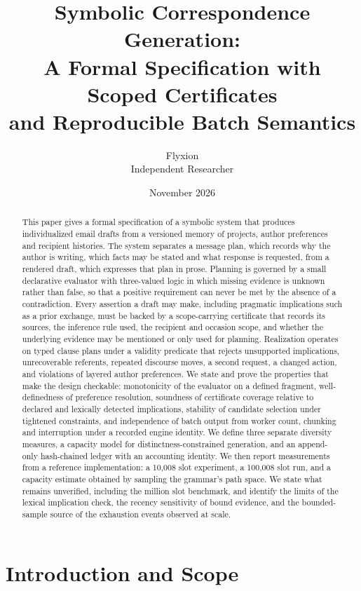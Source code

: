 \documentclass[11pt]{article}
\title{Symbolic Correspondence Generation:\\A Formal Specification with Scoped Certificates\\and Reproducible Batch Semantics}
\author{Flyxion\\Independent Researcher}
\date{November 2026}
\theoremstyle{definition}
\theoremstyle{remark}
\begin{document}
\maketitle

\begin{abstract}
This paper gives a formal specification of a symbolic system that produces individualized email drafts from a versioned memory of projects, author preferences and recipient histories. The system separates a message plan, which records why the author is writing, which facts may be stated and what response is requested, from a rendered draft, which expresses that plan in prose. Planning is governed by a small declarative evaluator with three-valued logic in which missing evidence is unknown rather than false, so that a positive requirement can never be met by the absence of a contradiction. Every assertion a draft may make, including pragmatic implications such as a prior exchange, must be backed by a scope-carrying certificate that records its sources, the inference rule used, the recipient and occasion scope, and whether the underlying evidence may be mentioned or only used for planning. Realization operates on typed clause plans under a validity predicate that rejects unsupported implications, unrecoverable referents, repeated discourse moves, a second request, a changed action, and violations of layered author preferences. We state and prove the properties that make the design checkable: monotonicity of the evaluator on a defined fragment, well-definedness of preference resolution, soundness of certificate coverage relative to declared and lexically detected implications, stability of candidate selection under tightened constraints, and independence of batch output from worker count, chunking and interruption under a recorded engine identity. We define three separate diversity measures, a capacity model for distinctness-constrained generation, and an append-only hash-chained ledger with an accounting identity. We then report measurements from a reference implementation: a 10,008 slot experiment, a 100,008 slot run, and a capacity estimate obtained by sampling the grammar's path space. We state what remains unverified, including the million slot benchmark, and identify the limits of the lexical implication check, the recency sensitivity of bound evidence, and the bounded-sample source of the exhaustion events observed at scale.
\end{abstract}

\newpage
\tableofcontents
\newpage
\section{Introduction and Scope}
\end{document}
